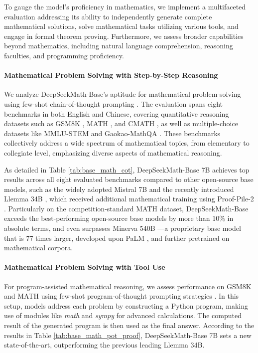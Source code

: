 To gauge the model's proficiency in mathematics, we implement a multifaceted evaluation addressing its ability to independently generate complete mathematical solutions, solve mathematical tasks utilizing various tools, and engage in formal theorem proving. Furthermore, we assess broader capabilities beyond mathematics, including natural language comprehension, reasoning faculties, and programming proficiency.

\paragraph{Mathematical Problem Solving with Step-by-Step Reasoning}

We analyze DeepSeekMath-Base’s aptitude for mathematical problem-solving using few-shot chain-of-thought prompting \citep{cot}. The evaluation spans eight benchmarks in both English and Chinese, covering quantitative reasoning datasets such as GSM8K \citep{gsm8k}, MATH \citep{MATH}, and CMATH \citep{wei2023cmath}, as well as multiple-choice datasets like MMLU-STEM \citep{mmlu} and Gaokao-MathQA \citep{agieval}. These benchmarks collectively address a wide spectrum of mathematical topics, from elementary to collegiate level, emphasizing diverse aspects of mathematical reasoning.

As detailed in Table \ref{tab:base_math_cot}, DeepSeekMath-Base 7B achieves top results across all eight evaluated benchmarks compared to other open-source base models, such as the widely adopted Mistral 7B \citep{mistral} and the recently introduced Llemma 34B \citep{llemma}, which received additional mathematical training using Proof-Pile-2 \citep{llemma}. Particularly on the competition-standard MATH dataset, DeepSeekMath-Base exceeds the best-performing open-source base models by more than 10\% in absolute terms, and even surpasses Minerva 540B \citep{minerva}—a proprietary base model that is 77 times larger, developed upon PaLM \citep{palm}, and further pretrained on mathematical corpora.

\paragraph{Mathematical Problem Solving with Tool Use} For program-assisted mathematical reasoning, we assess performance on GSM8K and MATH using few-shot program-of-thought prompting strategies \citep{pot,pal}. In this setup, models address each problem by constructing a Python program, making use of modules like \textit{math} and \textit{sympy} for advanced calculations. The computed result of the generated program is then used as the final answer. According to the results in Table \ref{tab:base_math_pot_proof}, DeepSeekMath-Base 7B sets a new state-of-the-art, outperforming the previous leading Llemma 34B.

